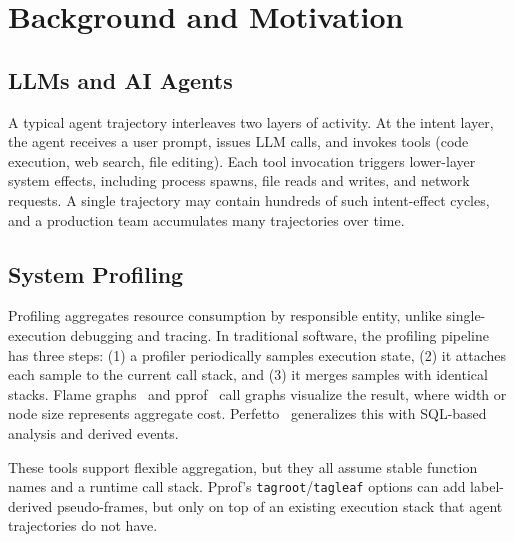 \documentclass[letterpaper]{article}
\begin{document}
\section{Background and Motivation}
\label{sec:background}

\subsection{LLMs and AI Agents}

A typical agent trajectory interleaves two layers of activity.
At the intent layer, the agent receives a user prompt, issues LLM
calls, and invokes tools (code execution, web search, file editing).
Each tool invocation triggers lower-layer system effects, including process
spawns, file reads and writes, and network requests.
A single trajectory may contain hundreds of such intent-effect
cycles, and a production team accumulates many trajectories over
time.

\subsection{System Profiling}

Profiling aggregates resource consumption by responsible entity, unlike
single-execution debugging and tracing.
In traditional software, the profiling pipeline has three steps: (1) a
profiler periodically samples execution state, (2) it attaches each sample to
the current call stack, and (3) it merges samples with identical stacks.
Flame graphs~\cite{flamegraphs} and pprof~\cite{pprof} call graphs
visualize the result, where width or node size represents aggregate
cost.
Perfetto~\cite{perfetto} generalizes this with SQL-based analysis
and derived events.

These tools support flexible aggregation, but they all assume
stable function names and a runtime call stack.
Pprof's \texttt{tagroot}/\texttt{tagleaf} options can add
label-derived pseudo-frames, but only on top of an existing execution
stack that agent trajectories do not have.
\end{document}
